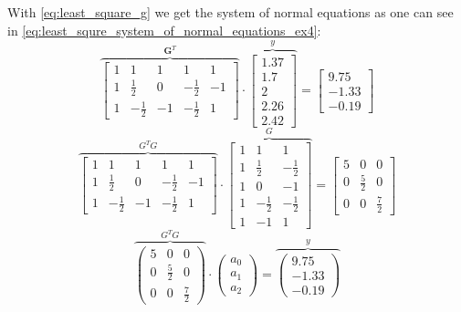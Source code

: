 With  \autoref{eq:least_square_g} we get the system of normal equations as one can see in \autoref{eq:least_squre_system_of_normal_equations_ex4}:
$$
\overbrace{\left[\begin{array}{ccccc}
1 & 1 & 1 & 1 & 1 \\
1 & \frac{1}{2} & 0 & -\frac{1}{2} & -1 \\
1 & -\frac{1}{2} & -1 & -\frac{1}{2} & 1
\end{array}\right]}^{\textbf{G}^T} \cdot \overbrace{\left[\begin{array}{c}
1.37 \\
1.7 \\
2 \\
2.26 \\
2.42
\end{array}\right]}^{y} =\left[\begin{array}{c}
9.75 \\
-1.33 \\
-0.19
\end{array}\right]
$$
$$
\overbrace{\left[\begin{array}{ccccc}
1 & 1 & 1 & 1 & 1 \\
1 & \frac{1}{2} & 0 & -\frac{1}{2} & -1 \\
1 & -\frac{1}{2} & -1 & -\frac{1}{2} & 1
\end{array}\right]}^{G^{T}G} \cdot \overbrace{\left[\begin{array}{ccc}
1 & 1 & 1 \\
1 & \frac{1}{2} & -\frac{1}{2} \\
1 & 0 & -1 \\
1 & -\frac{1}{2} & -\frac{1}{2} \\
1 & -1 & 1 
\end{array}\right]}^G=
\left[\begin{array}{ccc}
5 & 0 & 0 \\
0 & \frac{5}{2} & 0 \\
0 & 0 & \frac{7}{2}
\end{array}\right]
$$
\begin{equation}\label{eq:least_squre_system_of_normal_equations_ex4}
\overbrace{\left(\begin{array}{ccc}
5 & 0 & 0 \\
0 & \frac{5}{2} & 0 \\
0 & 0 & \frac{7}{2}
\end{array}\right)}^{G^{T}G} \cdot\left(\begin{array}{l}
a_0 \\
a_1 \\
a_2
\end{array}\right)=\overbrace{\left(\begin{array}{c}
9.75 \\
-1.33 \\
-0.19
\end{array}\right)}^{y}
\end{equation}
